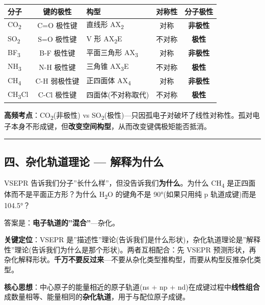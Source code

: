 {\def\LTcaptype{none} %
\begin{longtable}[]{@{}lclcc@{}}
\toprule\noalign{}
分子 & 键的极性 & 构型 & 对称性 & 分子极性 \\
\midrule\noalign{}
\endhead
\bottomrule\noalign{}
\endlastfoot
CO\textsubscript{2} & C=O 极性键 & 直线形 AX\textsubscript{2} & 对称 & \textbf{非极性} \\
SO\textsubscript{2} & S=O 极性键 & V 形 AX\textsubscript{2}E & 不对称 & \textbf{极性} \\
BF\textsubscript{3} & B-F 极性键 & 平面三角形 AX\textsubscript{3} & 对称 & \textbf{非极性} \\
NH\textsubscript{3} & N-H 极性键 & 三角锥 AX\textsubscript{3}E & 不对称 & \textbf{极性} \\
CH\textsubscript{4} & C-H 弱极性键 & 正四面体 AX\textsubscript{4} & 对称 & \textbf{非极性} \\
CH\textsubscript{3}Cl & C-Cl 极性键 & 四面体(不对称取代) & 不对称 & \textbf{极性} \\
\end{longtable}
}

\textbf{高频考点}：CO\textsubscript{2}(非极性) vs SO\textsubscript{2}(极性)---只因孤电子对破坏了线性对称性。孤对电子本身不形成键，但\textbf{改变空间构型}，从而改变键偶极矩能否抵消。

\begin{center}\rule{0.5\linewidth}{0.5pt}\end{center}

\subsection{四、杂化轨道理论 --- 解释为什么}\label{ux56dbux6742ux5316ux8f68ux9053ux7406ux8bba-ux89e3ux91caux4e3aux4ec0ux4e48}

VSEPR 告诉我们分子''长什么样''，但没告诉我们\textbf{为什么}。为什么 CH\textsubscript{4} 是正四面体而不是平面正方形？为什么 H\textsubscript{2}O 的键角不是 90°(如果只用纯 p 轨道成键)而是 104.5°？

答案是：\textbf{电子轨道的''混合''}---杂化。

\textbf{关键定位}：VSEPR 是''描述性''理论(告诉我们是什么形状)，杂化轨道理论是''解释性''理论(告诉我们为什么是那个形状)。两者互相配合：先 VSEPR 预测形状，再杂化解释形状。\textbf{千万不要反过来}---不要从杂化类型推构型，而要从构型反推杂化类型。

\textbf{核心思想}：中心原子的能量相近的原子轨道(ns + np + nd)在成键过程中\textbf{线性组合}成数量相等、能量相同的\textbf{杂化轨道}，用于与配位原子成键。

